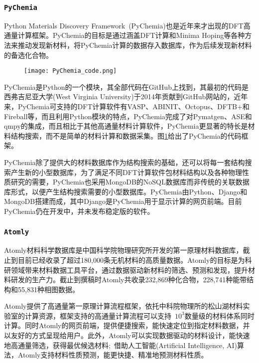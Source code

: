 \frame
{
\frametitle{\tt{PyChemia}}
\textrm{Python Materials Discovery Framework~(PyChemia)}也是近年来才出现的\textrm{DFT}高通量计算框架。\textrm{PyChemia}的目标是通过涵盖\textrm{DFT}计算和\textrm{Minima Hoping}等各种方法来推动发现新材料，将\textrm{PyChemia}计算的数据存入数据库，作为后续发现新材料的备选化合物。

\begin{figure}[h!]
\centering
\vspace*{-0.1in}
\texttt{[image: PyChemia\_code.png]}
\caption{\fontsize{7.2pt}{4.2pt}}%
\label{PyChemia_FireWork}
\end{figure} 
\textrm{PyChemia}是\textrm{Python}的一个模块，其全部代码在\textrm{GitHub}上找到\cite{PyChemia_Github}，其最初的代码是西弗吉尼亚大学\textrm{(West Virginia University)}于2014年贡献到\textrm{GitHub}网站的，近年来，\textrm{PyChemia}可支持的\textrm{DFT}计算软件有\textrm{VASP}、\textrm{ABINIT}、\textrm{Octopus}、\textrm{DFTB+}和\textrm{Fireball}等，而且利用Python模块的特点，\textrm{PyChemia}完成了对\textrm{Pymatgen}、\textrm{ASE}和\textrm{qmpy}的集成，而且相比于其他高通量材料计算软件，\textrm{PyChemia}更显著的特长是材料结构搜索，而不是简单的材料计算和数据采集。图\ref{PyChemia_FireWork}给出了\textrm{PyChemia}的代码框架。

\textrm{PyChemia}除了提供大的材料数据库作为结构搜索的基础，还可以将每一套结构搜索产生新的小型数据库，为了满足不同\textrm{DFT}计算软件包材料结构以及各种物理性质研究的需要，\textrm{PyChemia}也采用\textrm{MongoDB}的\textrm{NoSQL}数据库而非传统的关联数据库形式，以便产生结构搜索需要的小型数据库。\textrm{PyChemia}由\textrm{Python}、\textrm{Django}和\textrm{MongoDB}搭建而成，其中\textrm{Django}是\textrm{PyChemia}用于显示计算的网页前端。目前\textrm{PyChemia}仍在开发中，并未发布稳定版的软件。
}

\frame
{
\frametitle{\tt{Atomly}}
\textrm{Atomly}材料科学数据库\cite{ATOMLY_URL}是中国科学院物理研究所开发的第一原理材料数据库，截止到目前已经收录了超过180,000条无机材料的高质量数据。\textrm{Atomly}的目标是为科研领域带来材料数据工具平台，通过数据驱动新材料的筛选、预测和发现，提升材料研发的生产力。截止到撰稿时\textrm{Atomly}共收录232,869种化合物，228,741种能带结构和55,831种相图数据。

\textrm{Atomly}提供了高通量第一原理计算流程框架\cite{arXiv2108_00359v1}，依托中科院物理所的松山湖材料实验室的计算资源，框架支持的高通量计算流程可以支持~$10^3$数量级的材料体系同时计算。同时\textrm{Atomly}的网页前端，提供便捷搜索，能快速定位到指定材料数据，并以友好的方式呈现给用户。此外，\textrm{Atomly}可以实现数据驱动的材料设计，能快速地高通量筛选，获得最优候选材料;~借助人工智能\textrm{(Artificial Intelligence, AI)}算法，\textrm{Atomly}支持材料性质预测，能更快捷、精准地预测材料性质。
}
